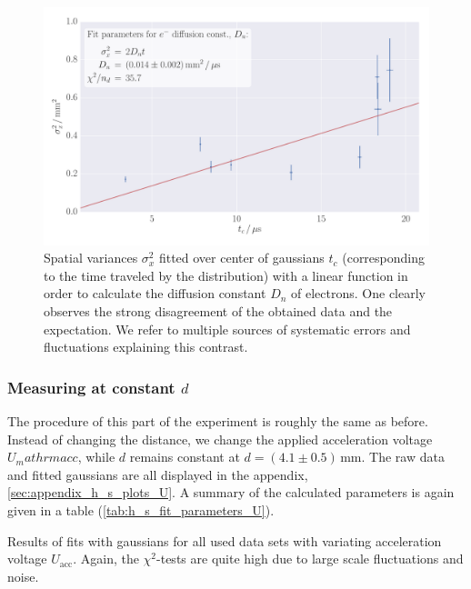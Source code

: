 \begin{figure}
    \includegraphics[width=1.0\textwidth]{figures/haynes_shockley_D_d}
    \caption{
        Spatial variances $\sigma_x^2$ fitted over center of gaussians $t_c$ 
        (corresponding to the time traveled by the distribution) with a linear 
        function in order to calculate the diffusion constant $D_n$ of electrons. 
        One clearly observes the strong disagreement of the obtained data and the 
        expectation. We refer to multiple sources of systematic errors and fluctuations 
        explaining this contrast. 
        }
    \label{fig:h_s_D_d}
\end{figure}
\FloatBarrier

\subsubsection{Measuring at constant $d$}
The procedure of this part of the experiment is roughly the same as before. 
Instead of changing the distance, we change the applied acceleration voltage 
$U_mathrm{acc}$, while $d$ remains constant at $d = (4.1 \pm 0.5)\,$mm. 
The raw data and fitted gaussians are all displayed in the appendix,
\ref{sec:appendix_h_s_plots_U}. A summary of the calculated parameters is 
again given in a table (\ref{tab:h_s_fit_parameters_U}). 
\renewcommand{\arraystretch}{1.5}
\begin{table}[htdp]
    \centering
    \caption{
        Results of fits with gaussians for all used data sets with variating 
        acceleration voltage
        $U_\mathrm{acc}$. Again, the $\chi^2$-tests are quite high due to 
        large scale fluctuations and noise. 
        }
    
    \label{tab:h_s_fit_parameters_U}
\end{table}

